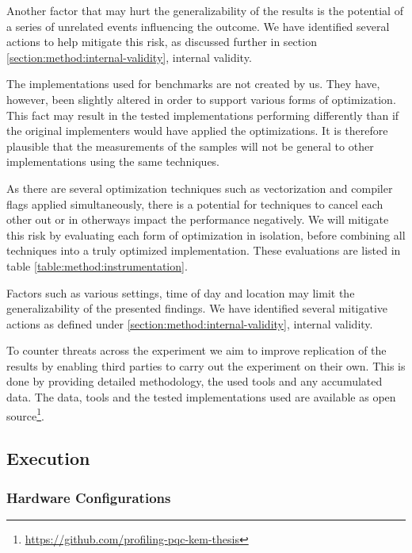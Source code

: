 Another factor that may hurt the generalizability of the results is the potential of a series of unrelated events influencing the outcome. We have identified several actions to help mitigate this risk, as discussed further in section \ref{section:method:internal-validity}, internal validity.

The implementations used for benchmarks are not created by us. They have, however, been slightly altered in order to support various forms of optimization. This fact may result in the tested implementations performing differently than if the original implementers would have applied the optimizations. It is therefore plausible that the measurements of the samples will not be general to other implementations using the same techniques.

As there are several optimization techniques such as vectorization and compiler flags applied simultaneously, there is a potential for techniques to cancel each other out or in otherways impact the performance negatively. We will mitigate this risk by evaluating each form of optimization in isolation, before combining all techniques into a truly optimized implementation. These evaluations are listed in table \ref{table:method:instrumentation}.

Factors such as various settings, time of day and location may limit the generalizability of the presented findings. We have identified several mitigative actions as defined under \ref{section:method:internal-validity}, internal validity.

To counter threats across the experiment we aim to improve replication of the results by enabling third parties to carry out the experiment on their own. This is done by providing detailed methodology, the used tools and any accumulated data. The data, tools and the tested implementations used are available as open source\footnote{\href{https://github.com/profiling-pqc-kem-thesis}{https://github.com/profiling-pqc-kem-thesis}}.

\subsection{Execution}

\subsubsection{Hardware Configurations}

